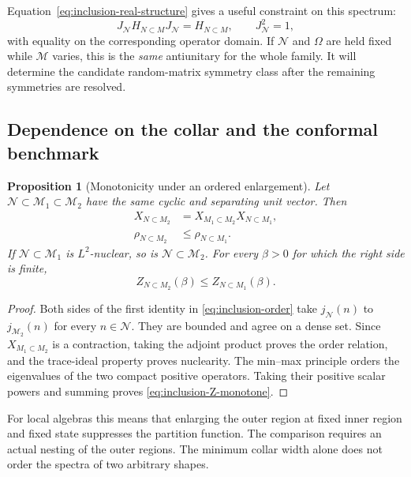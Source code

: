 \documentclass[a4paper,11pt]{article}
\newtheorem{proposition}[theorem]{Proposition}
\theoremstyle{definition}
\begin{document}
Equation~\eqref{eq:inclusion-real-structure} gives a useful constraint on this spectrum:
\begin{equation}
 J_{\mathcal N}H_{N\subset M}J_{\mathcal N}=H_{N\subset M},
 \qquad J_{\mathcal N}^2=1,
 \label{eq:inclusion-H-real}
\end{equation}
with equality on the corresponding operator domain. If $\mathcal N$ and $\Omega$ are held fixed while $\mathcal M$ varies, this is the \emph{same} antiunitary for the whole family. It will determine the candidate random-matrix symmetry class after the remaining symmetries are resolved.

\subsection{Dependence on the collar and the conformal benchmark}

\begin{proposition}[Monotonicity under an ordered enlargement]\label{prop:inclusion-monotonicity}
Let $\mathcal N\subset\mathcal M_1\subset\mathcal M_2$ have the same cyclic and separating unit vector. Then
\begin{align}
 X_{N\subset M_2}
   &=X_{M_1\subset M_2}X_{N\subset M_1},\nonumber\\
 \rho_{N\subset M_2}&\le\rho_{N\subset M_1}.
 \label{eq:inclusion-order}
\end{align}
If $\mathcal N\subset\mathcal M_1$ is $L^2$-nuclear, so is $\mathcal N\subset\mathcal M_2$. For every $\beta>0$ for which the right side is finite,
\begin{equation}
 Z_{N\subset M_2}(\beta)\le Z_{N\subset M_1}(\beta).
 \label{eq:inclusion-Z-monotone}
\end{equation}
\end{proposition}
\begin{proof}
Both sides of the first identity in \eqref{eq:inclusion-order} take $j_{\mathcal N}(n)$ to $j_{\mathcal M_2}(n)$ for every $n\in\mathcal N$. They are bounded and agree on a dense set. Since $X_{M_1\subset M_2}$ is a contraction, taking the adjoint product proves the order relation, and the trace-ideal property proves nuclearity. The min--max principle orders the eigenvalues of the two compact positive operators. Taking their positive scalar powers and summing proves \eqref{eq:inclusion-Z-monotone}.
\end{proof}

For local algebras this means that enlarging the outer region at fixed inner region and fixed state suppresses the partition function. The comparison requires an actual nesting of the outer regions. The minimum collar width alone does not order the spectra of two arbitrary shapes.
\end{document}
